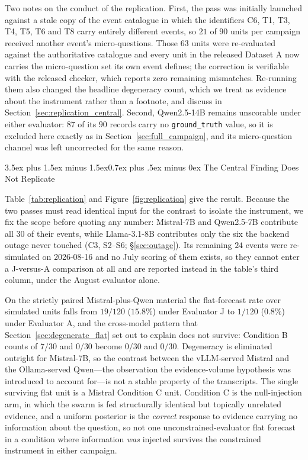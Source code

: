 \documentclass[11pt,journal,onecolumn]{IEEEtran}
\makeatletter
\renewcommand\subsection{\@startsection{subsection}{2}{\z@}%
  {3.5ex plus 1.5ex minus 1.5ex}{0.7ex plus .5ex minus 0ex}%
  {\normalfont\normalsize\bfseries}}
\makeatother
\begin{document}
Two notes on the conduct of the replication. First, the pass was initially launched against a stale copy of the event catalogue in which the identifiers C6, T1, T3, T4, T5, T6 and T8 carry entirely different events, so $21$ of $90$ units per campaign received another event's micro-questions. Those $63$ units were re-evaluated against the authoritative catalogue and every unit in the released Dataset A now carries the micro-question set its own event defines; the correction is verifiable with the released checker, which reports zero remaining mismatches. Re-running them also changed the headline degeneracy count, which we treat as evidence about the instrument rather than a footnote, and discuss in Section~\ref{sec:replication_central}. Second, Qwen2.5-14B remains unscorable under either evaluator: $87$ of its $90$ records carry no \texttt{ground\_truth} value, so it is excluded here exactly as in Section~\ref{sec:full_campaign}, and its micro-question channel was left uncorrected for the same reason.

\subsection{The Central Finding Does Not Replicate}
\label{sec:replication_central}

Table~\ref{tab:replication} and Figure~\ref{fig:replication} give the result. Because the two passes must read identical input for the contrast to isolate the instrument, we fix the scope before quoting any number: Mistral-7B and Qwen2.5-7B contribute all $30$ of their events, while Llama-3.1-8B contributes only the six the backend outage never touched (C3, S2--S6; \S\ref{sec:outage}). Its remaining $24$ events were re-simulated on 2026-08-16 and no July scoring of them exists, so they cannot enter a J-versus-A comparison at all and are reported instead in the table's third column, under the August evaluator alone.

On the strictly paired Mistral-plus-Qwen material the flat-forecast rate over simulated units falls from $19/120$ ($15.8\%$) under Evaluator J to $1/120$ ($0.8\%$) under Evaluator A, and the cross-model pattern that Section~\ref{sec:degenerate_flat} set out to explain does not survive: Condition B counts of $7/30$ and $0/30$ become $0/30$ and $0/30$. Degeneracy is eliminated outright for Mistral-7B, so the contrast between the vLLM-served Mistral and the Ollama-served Qwen---the observation the evidence-volume hypothesis was introduced to account for---is not a stable property of the transcripts. The single surviving flat unit is a Mistral Condition C unit. Condition C is the null-injection arm, in which the swarm is fed structurally identical but topically unrelated evidence, and a uniform posterior is the \emph{correct} response to evidence carrying no information about the question, so not one unconstrained-evaluator flat forecast in a condition where information \emph{was} injected survives the constrained instrument in either campaign.
\end{document}
